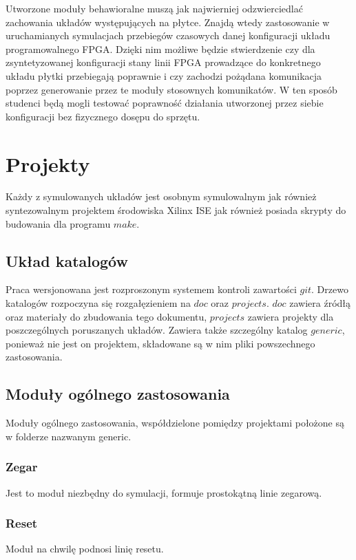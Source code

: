 \documentclass[a4paper,12pt]{article}
\begin{document}
Utworzone moduły behawioralne muszą jak najwierniej odzwierciedlać zachowania układów występujących na płytce.
Znajdą wtedy zastosowanie w uruchamianych symulacjach przebiegów czasowych danej konfiguracji układu programowalnego FPGA. Dzięki nim możliwe będzie stwierdzenie czy dla zsyntetyzowanej konfiguracji stany linii FPGA prowadzące do konkretnego układu płytki przebiegają poprawnie i czy zachodzi pożądana komunikacja poprzez generowanie przez te moduły stosownych komunikatów. W ten sposób studenci będą mogli testować poprawność działania utworzonej przez siebie konfiguracji bez fizycznego dosępu do sprzętu.


\newpage
\section{Projekty}
Każdy z symulowanych układów jest osobnym symulowalnym jak również syntezowalnym projektem środowiska Xilinx ISE jak również posiada skrypty do budowania dla programu $make$.

\subsection{Układ katalogów}
Praca wersjonowana jest rozproszonym systemem kontroli zawartości $git$. Drzewo katalogów rozpoczyna się rozgałęzieniem na $doc$ oraz $projects$. $doc$ zawiera źródłą oraz materiały do zbudowania tego dokumentu, $projects$ zawiera projekty dla poszczególnych poruszanych układów. Zawiera także szczególny katalog $generic$, ponieważ nie jest on projektem, składowane są w nim pliki powszechnego zastosowania.

\subsection{Moduły ogólnego zastosowania}
Moduły ogólnego zastosowania, współdzielone pomiędzy projektami położone są w folderze nazwanym generic.

\subsubsection{Zegar}
Jest to moduł niezbędny do symulacji, formuje prostokątną linie zegarową.


\subsubsection{Reset}
Moduł na chwilę podnosi linię resetu.

\end{document}
